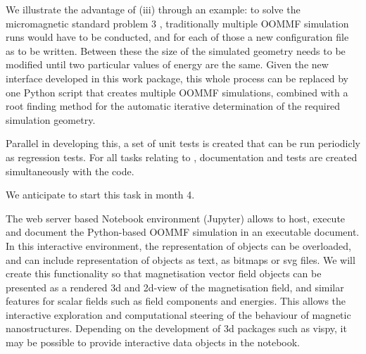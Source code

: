 \begin{workpackage}
\begin{tasklist}
\begin{task}[id=oommf-python-interface,title=OOMMF case study: Create Python interface to OOMMF code]
  We illustrate the advantage of (iii) through an example: to solve
  the micromagnetic standard problem 3
  \cite{Micromagnetic-Standardproblem-3}, traditionally multiple OOMMF
  simulation runs would have to be conducted, and for each of those a
  new configuration file as to be written. Between these the size of
  the simulated geometry needs to be modified until two particular
  values of energy are the same. Given the new interface developed in
  this work package, this whole process can be replaced by one Python
  script that creates multiple OOMMF simulations, combined with a root
  finding method for the automatic iterative determination of the
  required simulation geometry.

  Parallel in developing this, a set of unit tests is created that can
  be run periodicly as regression tests. For all tasks relating to
  \OOMMFNB, documentation and tests are created simultaneously with
  the code.

  We anticipate to start this task 
  in month 4.
\end{task}

\begin{task}[title=OOMMF case study: Extend \texttt{OOMMF-py} with IPython
    notebook attributes and GUI templates]

  The web server based Notebook environment (Jupyter) allows to host,
  execute and document the Python-based OOMMF simulation in an
  executable document. In this interactive environment, the
  representation of objects can be overloaded, and can include
  representation of objects as text, as bitmaps or svg files. We will
  create this functionality so that magnetisation vector field objects
  can be presented as a rendered 3d and 2d-view of the magnetisation
  field, and similar features for scalar fields such as field
  components and energies. This allows the interactive exploration and
  computational steering of the behaviour of magnetic
  nanostructures. Depending on the development of 3d packages such as
  vispy, it may be possible to provide interactive data objects in the
  notebook.


\end{task}
\end{tasklist}
\end{workpackage}
